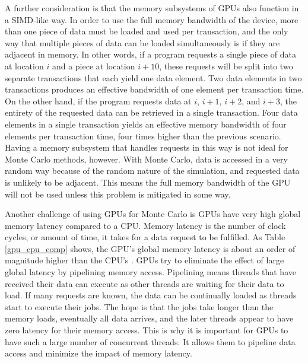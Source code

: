\documentclass[preprint,12pt]{elsarticle}
\begin{document}
A further consideration is that the memory subsystems of GPUs also function in a SIMD-like way.  In order to use the full memory bandwidth of the device, more than one piece of data must be loaded and used per transaction, and the only way that multiple pieces of data can be loaded simultaneously is if they are adjacent in memory.  In other words, if a program requests a single piece of data at location $i$ and a piece at location $i+10$, these requests will be split into two separate transactions that each yield one data element.
  Two data elements in two transactions produces an effective bandwidth of one element per transaction time. 
On the other hand, if the program requests data at $i$, $i+1$, $i+2$, and $i+3$, the entirety of the requested data can be retrieved in a single transaction.  Four data elements in a single transaction yields an effective memory bandwidth of four elements per transaction time, four times higher than the previous scenario.  Having a memory subsystem that handles requests in this way is not ideal for Monte Carlo methods, however.  With Monte Carlo, data is accessed in a very random way because of the random nature of the simulation, and requested data is unlikely to be adjacent.  This means the full memory bandwidth of the GPU will not be used unless this problem is mitigated in some way.

Another challenge of using GPUs for Monte Carlo is GPUs have very high global memory latency compared to a CPU.  Memory latency is the number of clock cycles, or amount of time, it takes for a data request to be fulfilled.  As Table \ref{gpu_cpu_comp} shows, the GPU's global memory latency is about an order of magnitude higher than the CPU's \cite{cpu_latency,cuda}.  
GPUs try to eliminate the effect of large global latency by pipelining memory access.  Pipelining means threads that have received their data can execute as other threads are waiting for their data to load.  If many requests are known, the data can be continually loaded as threads start to execute their jobs.  The hope is that the jobs take longer than the memory loads, eventually all data arrives, and the later threads appear to have zero latency for their memory access.  This is why it is important for GPUs to have such a large number of concurrent threads.  It allows them to pipeline data access and minimize the impact of memory latency.
\end{document}
